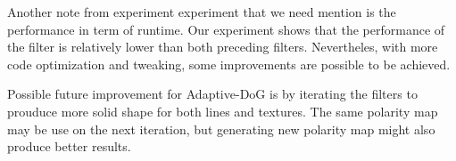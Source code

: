 Another note from experiment experiment that we need mention is the performance in term of runtime. Our experiment shows that the performance of the filter is relatively lower than both preceding filters. Nevertheles, with more code optimization and tweaking, some improvements are possible to be achieved.

Possible future improvement for Adaptive-DoG is by iterating the filters to prouduce more solid shape for both lines and textures. The same polarity map may be use on the next iteration, but generating new polarity map might also produce better results.


 
 
